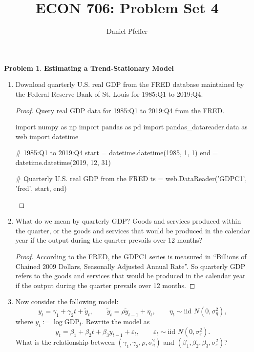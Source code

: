 \documentclass[oneside,reqno]{amsart}
\title{ECON 706: Problem Set 4}
\author{Daniel Pfeffer}
\newcommand{\eps}{\varepsilon}
\theoremstyle{definition}
\newtheorem{prob}{Problem}
\begin{document}
\maketitle

\begin{prob}\label{prob1}
\textbf{Estimating a Trend-Stationary Model}
\end{prob}

\begin{enumerate}
\item
Download quarterly U.S. real GDP from the FRED database maintained by the Federal Reserve Bank of St. Louis for 1985:Q1 to 2019:Q4.

\begin{proof}
Query real GDP data for 1985:Q1 to 2019:Q4 from the FRED. 
\begin{python3code}
import numpy as np
import pandas as pd
import pandas_datareader.data as web
import datetime

# 1985:Q1 to 2019:Q4
start = datetime.datetime(1985, 1, 1)
end = datetime.datetime(2019, 12, 31)

# Quarterly U.S. real GDP from the FRED
ts = web.DataReader('GDPC1', 'fred', start, end)
\end{python3code}
\end{proof}

\item
What do we mean by quarterly GDP? Goods and services produced within the quarter, or the goods and services that would be produced in the calendar year if the output during the quarter prevails over 12 months?

\begin{proof}
According to the FRED, the GDPC1 series is measured in ``Billions of Chained 2009 Dollars, Seasonally Adjusted Annual Rate''. So quarterly GDP refers to the goods and services that would be produced in the calendar year if the output during the quarter prevails over 12 months.
\end{proof}


\item
Now consider the following model:
\begin{equation}\label{eq:1}
	y_t = \gamma_1  + \gamma_2 t + \tilde y_t, 
	\qquad 
	\tilde y_t = \rho  \tilde y_{t-1} + \eta_t,
	\qquad 
	\eta_t \sim \text{iid } N(0, \sigma_\eta^2),
\end{equation}
where $y_t := \log \text{GDP}_t$. Rewrite the model as 
\begin{equation}\label{eq:2}
	y_t = \beta_1 + \beta_2 t + \beta_3 y_{t-1} + \eps_t,
	\qquad 
	\eps_t \sim \text{iid }N(0, \sigma_\eps^2).
\end{equation}
What is the relationship between $(\gamma_1, \gamma_2, \rho, \sigma_\eta^2)$ and $(\beta_1, \beta_2, \beta_3, \sigma_\eps^2)$?


\end{enumerate}
\end{document}
